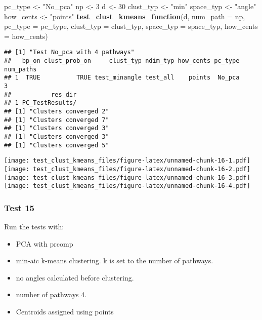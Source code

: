 \documentclass[
]{article}
\newenvironment{Shaded}{\begin{snugshade}}{\end{snugshade}}
\newcommand{\AttributeTok}[1]{\textcolor[rgb]{0.13,0.29,0.53}{#1}}
\newcommand{\DecValTok}[1]{\textcolor[rgb]{0.00,0.00,0.81}{#1}}
\newcommand{\FunctionTok}[1]{\textcolor[rgb]{0.13,0.29,0.53}{\textbf{#1}}}
\newcommand{\NormalTok}[1]{#1}
\newcommand{\OtherTok}[1]{\textcolor[rgb]{0.56,0.35,0.01}{#1}}
\newcommand{\StringTok}[1]{\textcolor[rgb]{0.31,0.60,0.02}{#1}}
\providecommand{\tightlist}{%
  \setlength{\itemsep}{0pt}\setlength{\parskip}{0pt}}
\begin{document}
\begin{Shaded}
\begin{Highlighting}[]
\NormalTok{pc\_type }\OtherTok{\textless{}{-}} \StringTok{"No\_pca"}
\NormalTok{np }\OtherTok{\textless{}{-}} \DecValTok{3}
\NormalTok{d }\OtherTok{\textless{}{-}} \DecValTok{30}
\NormalTok{clust\_typ }\OtherTok{\textless{}{-}} \StringTok{"min"}
\NormalTok{space\_typ }\OtherTok{\textless{}{-}} \StringTok{"angle"}
\NormalTok{how\_cents }\OtherTok{\textless{}{-}} \StringTok{"points"}
\FunctionTok{test\_clust\_kmeans\_function}\NormalTok{(d,}
                           \AttributeTok{num\_path =}\NormalTok{ np,}
                           \AttributeTok{pc\_type =}\NormalTok{ pc\_type,}
                           \AttributeTok{clust\_typ =}\NormalTok{ clust\_typ,}
                           \AttributeTok{space\_typ =}\NormalTok{ space\_typ,}
                           \AttributeTok{how\_cents =}\NormalTok{ how\_cents)}
\end{Highlighting}
\end{Shaded}

\begin{verbatim}
## [1] "Test No_pca with 4 pathways"
##   bp_on clust_prob_on     clust_typ ndim_typ how_cents pc_type num_paths
## 1  TRUE          TRUE test_minangle test_all    points  No_pca         3
##           res_dir
## 1 PC_TestResults/
## [1] "Clusters converged 2"
## [1] "Clusters converged 7"
## [1] "Clusters converged 3"
## [1] "Clusters converged 3"
## [1] "Clusters converged 5"
\end{verbatim}

\texttt{[image: test\_clust\_kmeans\_files/figure-latex/unnamed-chunk-16-1.pdf]}
\texttt{[image: test\_clust\_kmeans\_files/figure-latex/unnamed-chunk-16-2.pdf]}
\texttt{[image: test\_clust\_kmeans\_files/figure-latex/unnamed-chunk-16-3.pdf]}
\texttt{[image: test\_clust\_kmeans\_files/figure-latex/unnamed-chunk-16-4.pdf]}

\hypertarget{test-15}{%
\subsubsection{Test 15}\label{test-15}}

Run the tests with:

\begin{itemize}
\tightlist
\item
  PCA with prcomp
\item
  min-aic k-means clustering. k is set to the number of pathways.
\item
  no angles calculated before clustering.
\item
  number of pathways 4.
\item
  Centroids assigned using points
\end{itemize}
\end{document}
